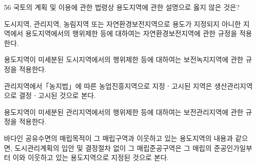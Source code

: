 \begin{question}{56}
국토의 계획 및 이용에 관한 법령상 용도지역에 관한 설명으로 옳지 않은 것은?
\begin{choices}
  \item 도시지역, 관리지역, 농림지역 또는 자연환경보전지역으로 용도가 지정되지 아니한 지역에서 용도지역에서의 행위제한 등에 대하여는 자연환경보전지역에 관한 규정을 적용한다.
  \item 용도지역이 미세분된 도시지역에서의 행위제한 등에 대하여는 보전녹지지역에 관한 규정을 적용한다.
  \item 관리지역에서「농지법」에 따른 농업진흥지역으로 지정ㆍ고시된 지역은 생산관리지역으로 결정ㆍ고시된 것으로 본다.
  \item 용도지역이 미세분된 관리지역에서의 행위제한 등에 대하여는 보전관리지역에 관한 규정을 적용한다.
  \item 바다인 공유수면의 매립목적이 그 매립구역과 이웃하고 있는 용도지역의 내용과 같으면, 도시관리계획의 입안 및 결정절차 없이 그 매립준공구역은 그 매립의 준공인가일부터 이와 이웃하고 있는 용도지역으로 지정된 것으로 본다.
\end{choices}
\end{question}
